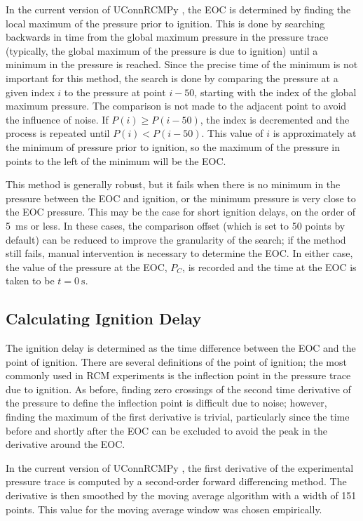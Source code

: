 \documentclass[12pt]{../ussci}
\begin{document}
In the current version of UConnRCMPy \autocite{uconnrcmpy}, the EOC is
determined by finding the local maximum of the pressure prior to
ignition. This is done by searching backwards in time from the global
maximum pressure in the pressure trace (typically, the global maximum of
the pressure is due to ignition) until a minimum in the pressure is
reached. Since the precise time of the minimum is not important for this
method, the search is done by comparing the pressure at a given index
\(i\) to the pressure at point \(i-50\), starting with the index of the
global maximum pressure. The comparison is not made to the adjacent
point to avoid the influence of noise. If \(P(i) \geq P(i-50)\), the
index is decremented and the process is repeated until
\(P(i) < P(i-50)\). This value of \(i\) is approximately at the minimum
of pressure prior to ignition, so the maximum of the pressure in points
to the left of the minimum will be the EOC.

This method is generally robust, but it fails when there is no minimum
in the pressure between the EOC and ignition, or the minimum pressure is
very close to the EOC pressure. This may be the case for short ignition
delays, on the order of \SI{5}{\ms} or less. In these cases, the comparison
offset (which is set to 50 points by default) can be reduced to improve
the granularity of the search; if the method still fails, manual
intervention is necessary to determine the EOC. In either case, the
value of the pressure at the EOC, \(P_C\), is recorded and the time at
the EOC is taken to be \(t=\SI{0}{\s}\).

\subsection{Calculating Ignition Delay}\label{calculating-ignition-delay}

The ignition delay is determined as the time difference between the EOC
and the point of ignition. There are several definitions of the point of
ignition; the most commonly used in RCM experiments is the inflection
point in the pressure trace due to ignition. As before, finding zero
crossings of the second time derivative of the pressure to define the
inflection point is difficult due to noise; however, finding the maximum
of the first derivative is trivial, particularly since the time before
and shortly after the EOC can be excluded to avoid the peak in the
derivative around the EOC.

In the current version of UConnRCMPy \autocite{uconnrcmpy}, the first
derivative of the experimental pressure trace is computed by a
second-order forward differencing method. The derivative is then
smoothed by the moving average algorithm with a width of 151 points.
This value for the moving average window was chosen empirically.
\end{document}
